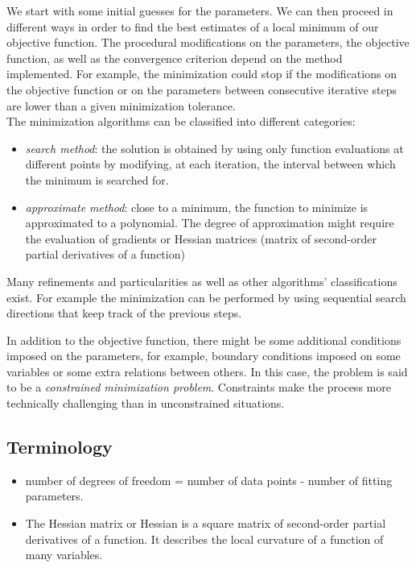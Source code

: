 We start with some initial guesses for the parameters. We can then
proceed in different ways in order to find the best estimates of a
local minimum of our objective function. The procedural modifications
on the parameters, the objective function, as well as the convergence
criterion depend on the method implemented. For example, the
minimization could stop if the modifications on the objective function
or on the parameters between consecutive iterative steps are lower than a given minimization tolerance.\\
The minimization algorithms can be classified into different categories:
\begin{itemize}
\item \textit{search method}: the solution is obtained by using only function
  evaluations at different points by modifying, at each iteration, the interval between which the minimum is searched for.
\item \textit{approximate method}: close to a minimum, the function to minimize is approximated to
  a polynomial. The degree of approximation might require the evaluation of gradients or Hessian matrices (matrix of second-order partial derivatives of a function) 
\end{itemize}
Many refinements and particularities as well as other algorithms'
classifications exist. For example the
minimization can be performed by using sequential search directions that keep track of the previous steps.

In addition to the objective function, there might be some
additional conditions imposed on the parameters, for example, boundary conditions imposed on some variables or some extra relations between others. In this case, the problem is
said to be a \textit{constrained minimization problem}. Constraints
make the process more technically challenging than in unconstrained situations.


\subsection{Terminology}
\begin{itemize}
\item number of degrees of freedom = number of data points - number of fitting parameters.
\item The Hessian matrix or Hessian is a square matrix of second-order partial derivatives of a function. It describes the local curvature of a function of many variables.
\end{itemize}
